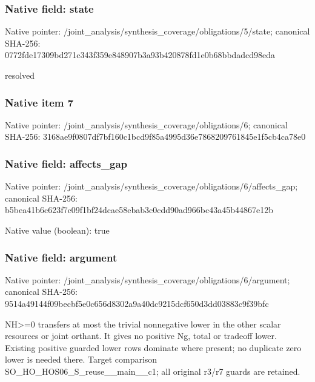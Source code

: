 \documentclass[10pt,a4paper]{article}
\begin{document}
\subsubsection{Native field: state}
Native pointer: /joint\_\allowbreak{}analysis/synthesis\_\allowbreak{}coverage/obligations/5/state; canonical SHA-256: 0772fde17309bd271c343f359e848907b3a93b420878fd1e0b68bbdadcd98eda

\begingroup\raggedright\sloppy resolved\par\endgroup

\subsubsection{Native item 7}
Native pointer: /joint\_\allowbreak{}analysis/synthesis\_\allowbreak{}coverage/obligations/6; canonical SHA-256: 3168ae9f0807df7bf160c1bcd9f85a4995d36e7868209761845e1f5cb4ca78e0

\subsubsection{Native field: affects\_\allowbreak{}gap}
Native pointer: /joint\_\allowbreak{}analysis/synthesis\_\allowbreak{}coverage/obligations/6/affects\_\allowbreak{}gap; canonical SHA-256: b5bea41b6c623f7c09f1bf24dcae58ebab3c0cdd90ad966bc43a45b44867e12b

Native value (boolean): true

\subsubsection{Native field: argument}
Native pointer: /joint\_\allowbreak{}analysis/synthesis\_\allowbreak{}coverage/obligations/6/argument; canonical SHA-256: 9514a49144f09becbf5e0c656d8302a9a40dc9215dcf650d3dd03883c9f39bfc

\begingroup\raggedright\sloppy NH>=\allowbreak{}0 transfers at most the trivial nonnegative lower in the other scalar resources or joint orthant. It gives no positive Ng,\allowbreak{} total or tradeoff lower. Existing positive guarded lower rows dominate where present;\allowbreak{} no duplicate zero lower is needed there. Target comparison SO\_\allowbreak{}HO\_\allowbreak{}HOS06\_\allowbreak{}S\_\allowbreak{}reuse\_\allowbreak{}\_\allowbreak{}main\_\allowbreak{}\_\allowbreak{}c1;\allowbreak{} all original r3/\allowbreak{}r7 guards are retained.\par\endgroup
\end{document}
